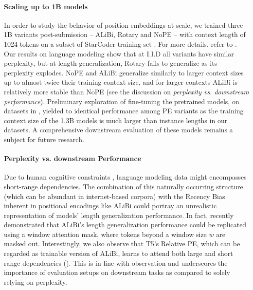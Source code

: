 \documentclass{article}
\begin{document}
\paragraph{Scaling up to 1B models}
In order to study the behavior of position embeddings at scale, we trained three 1B variants post-submission -- ALiBi, Rotary and NoPE -- with context length of 1024 tokens on a subset of StarCoder training set \citep{Li2023:Starcoder}.
For more details, refer to .
Our results on language modeling show that at I.I.D all variants have similar perplexity, but at length generalization, Rotary fails to generalize as its perplexity explodes. NoPE and ALiBi generalize similarly to larger context sizes up to almost twice their training context size, and for larger contexts ALiBi is relatively more stable than NoPE (see the discussion on \emph{perplexity vs. downstream performance}).
Preliminary exploration of fine-tuning the pretrained models, on datasets in , yielded to identical performance among PE variants as the training context size of the 1.3B models is much larger than instance lengths in our datasets. A comprehensive downstream evaluation of these models remains a subject for future research. 



\paragraph{Perplexity vs. downstream Performance}
Due to human cognitive constraints \citep{Gibson1998:Locality,Kiyono2021:ShiftingAbsolutePositionEmbedding}, language modeling data might encompasses short-range dependencies. The combination of this naturally occurring structure (which can be abundant in internet-based corpora) with the Recency Bias inherent in positional encodings like ALiBi could portray an unrealistic representation of models' length generalization performance. 
In fact, \citet{Chi2023:DissectingLenGen} recently demonstrated that ALiBi’s length generalization performance could be replicated using a window attention mask, where tokens beyond a window size $w$ are masked out. Interestingly, we also observe that T5's Relative PE, which can be regarded as trainable version of ALiBi, learns to attend both large and short range dependencies (). 
This is in line with \citet{Tay2022:PerplexityDontTransfer} observation and underscores the importance of evaluation setups on downstream tasks as compared to solely relying on perplexity.
\end{document}
